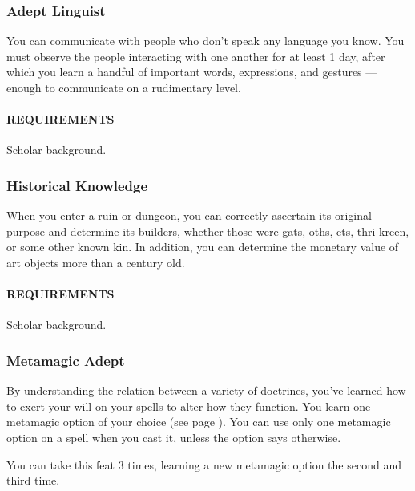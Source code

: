     \subsubsection{Adept Linguist} \label{feat::adeptlinguist}
        You can communicate with people who don't speak any language you know.
        You must observe the people interacting with one another for at least 1 day, after which you learn a handful of important words, expressions, and gestures --- enough to communicate on a rudimentary level.
        \paragraph{REQUIREMENTS} Scholar background.

    \subsubsection{Historical Knowledge} \label{feat::historicalknowledge}
        When you enter a ruin or dungeon, you can correctly ascertain its original purpose and determine its builders, whether those were gats, oths, ets, thri-kreen, or some other known kin.
        In addition, you can determine the monetary value of art objects more than a century old.
        \paragraph{REQUIREMENTS} Scholar background.

    \subsubsection{Metamagic Adept} \label{feat::metamagicadept}
        By understanding the relation between a variety of doctrines, you've learned how to exert your will on your spells to alter how they function.
        You learn one metamagic option of your choice (see page \pageref{ssec::metamagic}).
        You can use only one metamagic option on a spell when you cast it, unless the option says otherwise.

        You can take this feat 3 times, learning a new metamagic option the second and third time.
